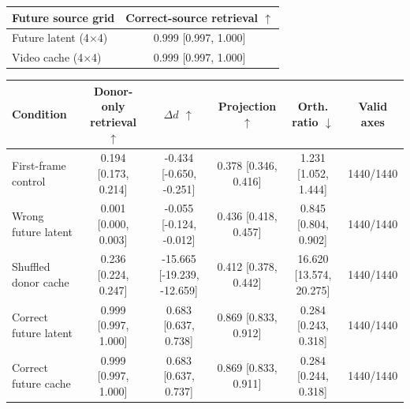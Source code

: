 \begin{tabular}{lc}
\toprule
Future source grid & Correct-source retrieval $\uparrow$ \\
\midrule
Future latent (4$\times$4) & 0.999 [0.997, 1.000] \\
Video cache (4$\times$4) & 0.999 [0.997, 1.000] \\
\bottomrule
\end{tabular}


\begin{tabular}{lccccc}
\toprule
Condition & Donor-only retrieval $\uparrow$ & $\Delta d$ $\uparrow$ & Projection $\uparrow$ & Orth. ratio $\downarrow$ & Valid axes \\
\midrule
First-frame control & 0.194 [0.173, 0.214] & -0.434 [-0.650, -0.251] & 0.378 [0.346, 0.416] & 1.231 [1.052, 1.444] & 1440/1440 \\
Wrong future latent & 0.001 [0.000, 0.003] & -0.055 [-0.124, -0.012] & 0.436 [0.418, 0.457] & 0.845 [0.804, 0.902] & 1440/1440 \\
Shuffled donor cache & 0.236 [0.224, 0.247] & -15.665 [-19.239, -12.659] & 0.412 [0.378, 0.442] & 16.620 [13.574, 20.275] & 1440/1440 \\
Correct future latent & 0.999 [0.997, 1.000] & 0.683 [0.637, 0.738] & 0.869 [0.833, 0.912] & 0.284 [0.243, 0.318] & 1440/1440 \\
Correct future cache & 0.999 [0.997, 1.000] & 0.683 [0.637, 0.737] & 0.869 [0.833, 0.911] & 0.284 [0.244, 0.318] & 1440/1440 \\
\bottomrule
\end{tabular}

